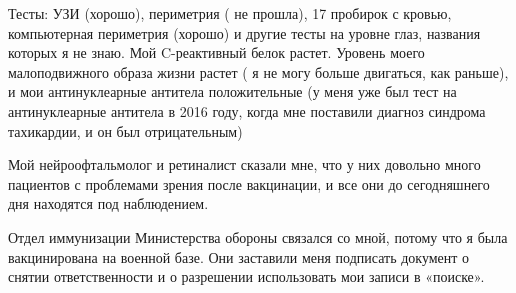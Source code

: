 {Тесты: УЗИ (хорошо), периметрия ( не прошла), 17 пробирок с кровью, компьютерная
периметрия (хорошо) и другие тесты на уровне глаз, названия которых я не
знаю. Мой C-реактивный белок растет. Уровень моего малоподвижного образа жизни
растет ( я не могу больше двигаться, как раньше), и мои антинуклеарные антитела
положительные (у меня уже был тест на антинуклеарные антитела в 2016 году, когда
мне поставили диагноз синдрома тахикардии, и он был отрицательным)

Мой нейроофтальмолог и ретиналист сказали мне, что у них довольно много
пациентов с проблемами зрения после вакцинации, и все они до сегодняшнего дня
находятся под наблюдением.

Отдел иммунизации Министерства обороны связался со мной, потому что я была
вакцинирована на военной базе. Они заставили меня подписать документ о снятии
ответственности и о разрешении использовать мои записи в «поиске».


}
